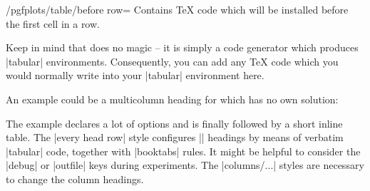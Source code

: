 \begin{key}{/pgfplots/table/before row=}
    Contains \TeX{} code which will be installed before the first cell in a
    row.

    Keep in mind that \PGFPlotstable{} does no magic -- it is simply a code
    generator which produces |tabular| environments. Consequently, you can add
    any \TeX{} code which you would normally write into your |tabular|
    environment here.

    An example could be a multicolumn heading for which \PGFPlotstable{} has no
    own solution:
\begin{codeexample}[pre={\begin{lateximage}},post={\end{lateximage}}]
\end{codeexample}
%
    \noindent The example declares a lot of options and is finally followed by
    a short inline table. The |every head row| style configures |\multicolumn|
    headings by means of verbatim |tabular| code, together with |booktabs|
    rules. It might be helpful to consider the |debug| or |outfile| keys during
    experiments. The |columns/...| styles are necessary to change the column
    headings.


\end{key}
